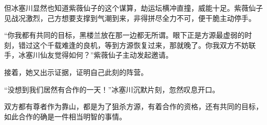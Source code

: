 \begin{this_body}
但冰塞川显然也知道紫薇仙子的这个谋算，劫运坛横冲直撞，威能十足。紫薇仙子见战况激烈，己方想要支撑到气潮到来，非得拼尽全力不可，便干脆主动停手。

“你我都有共同的目标，黑楼兰放在那一边都无所谓。眼下正是方源最虚弱的时刻，错过这个千载难逢的良机，等到方源恢复过来，那就晚了。你我双方不妨联手，冰塞川仙友觉得如何？”紫薇仙子主动发起邀请。

接着，她又出示证据，证明自己此刻的阵营。

“没想到我们居然有合作的一天！”冰塞川沉默片刻，忽然叹息开口。

双方都有尊者作为靠山，都是为了狙杀方源，有着合作的资格，还有共同的目标，如此合作的确是一件相当明智的事情。

\end{this_body}

